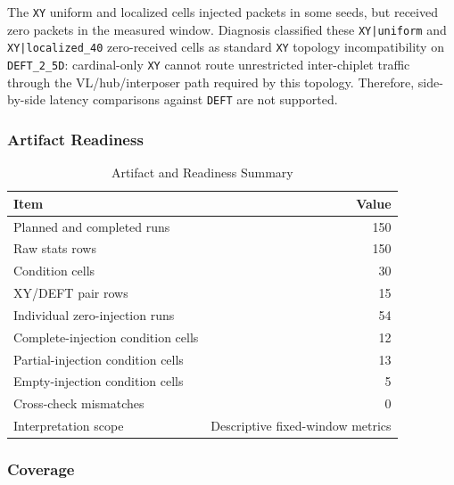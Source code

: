 \documentclass[conference]{IEEEtran}
\begin{document}
The \texttt{XY} uniform and localized cells injected packets in some seeds, but received zero packets in the measured window. Diagnosis classified these \texttt{XY|uniform} and \texttt{XY|localized\_40} zero-received cells as standard \texttt{XY} topology incompatibility on \texttt{DEFT\_2\_5D}: cardinal-only \texttt{XY} cannot route unrestricted inter-chiplet traffic through the VL/hub/interposer path required by this topology. Therefore, side-by-side latency comparisons against \texttt{DEFT} are not supported.

\subsubsection{Artifact Readiness}

\begin{table}[t]
\centering
\caption{Artifact and Readiness Summary}
\label{tab:readiness}
\begin{tabular}{@{}lr@{}}
\toprule
\textbf{Item} & \textbf{Value} \\
\midrule
Planned and completed runs & 150 \\
Raw stats rows & 150 \\
Condition cells & 30 \\
XY/DEFT pair rows & 15 \\
Individual zero-injection runs & 54 \\
Complete-injection condition cells & 12 \\
Partial-injection condition cells & 13 \\
Empty-injection condition cells & 5 \\
Cross-check mismatches & 0 \\
Interpretation scope & Descriptive fixed-window metrics \\
\bottomrule
\end{tabular}
\end{table}

\subsubsection{Coverage}
\end{document}
